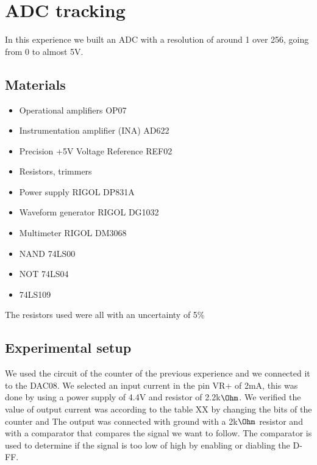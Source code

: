 \chapter{ADC tracking}
In this experience we built an ADC with a resolution of around 1 over 256, going from 0 to almost 5V.

\section{Materials}
\begin{itemize}
\item Operational amplifiers OP07
\item Instrumentation amplifier (INA) AD622
\item Precision +5V Voltage Reference REF02
\item Resistors, trimmers
\item Power supply RIGOL DP831A
\item Waveform generator RIGOL DG1032
\item Multimeter RIGOL DM3068
\item NAND 74LS00
\item NOT 74LS04
\item 74LS109 
\end{itemize}
The resistors used were all with an uncertainty of 5\%

\section{Experimental setup}
We used the circuit of the counter of the previous experience and we connected it to the DAC08. We selected an input current in the pin VR+ of 2mA, this was done by using a power supply of 4.4V and resistor of 2.2k$\Ohm$. We verified the value of output current was according to the table XX by changing the bits of the counter and The output was connected with ground with a 2k$\Ohm$ resistor and with a comparator that compares the signal we want to follow. The comparator is used to determine if the signal is too low of high by enabling or diabling the D-FF.

